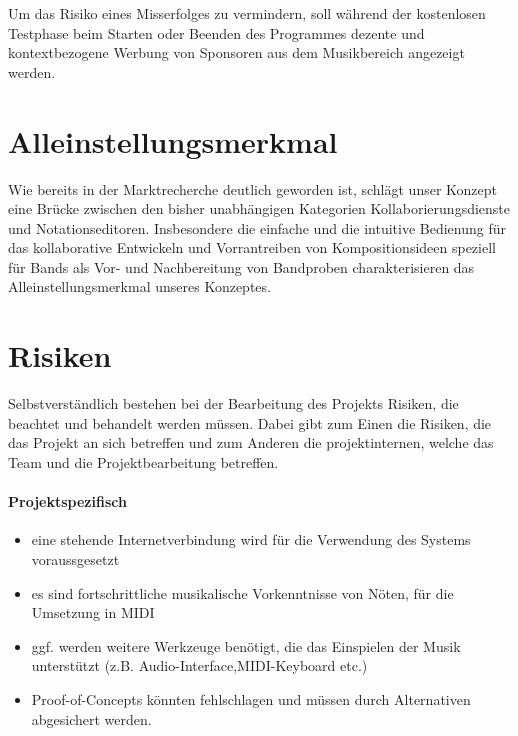 \documentclass[12pt]{scrartcl}
\begin{document}
Um das Risiko eines Misserfolges zu vermindern, soll während der kostenlosen Testphase beim Starten oder Beenden des Programmes dezente und kontextbezogene Werbung von Sponsoren aus dem Musikbereich angezeigt werden.



\section{Alleinstellungsmerkmal}

Wie bereits in der Marktrecherche deutlich geworden ist, schlägt unser Konzept eine Brücke zwischen den bisher unabhängigen Kategorien Kollaborierungsdienste und Notationseditoren. Insbesondere die einfache und die intuitive Bedienung für das kollaborative Entwickeln und Vorrantreiben von Kompositionsideen speziell für Bands als Vor- und Nachbereitung von Bandproben charakterisieren das Alleinstellungsmerkmal unseres Konzeptes.


\section{Risiken}



Selbstverständlich bestehen bei der Bearbeitung des Projekts Risiken, die beachtet und behandelt werden müssen. Dabei gibt zum Einen die Risiken, die das Projekt an sich betreffen und zum Anderen die projektinternen, welche das Team und die Projektbearbeitung betreffen.

\paragraph{Projektspezifisch}
\begin{itemize}
\item eine stehende Internetverbindung wird für die Verwendung des Systems voraussgesetzt
\item es sind fortschrittliche musikalische Vorkenntnisse von Nöten, für die Umsetzung in MIDI
\item ggf. werden weitere Werkzeuge benötigt, die das Einspielen der Musik unterstützt (z.B. Audio-Interface,MIDI-Keyboard etc.)
\item Proof-of-Concepts könnten fehlschlagen und müssen durch Alternativen abgesichert werden.
\end{itemize}
\end{document}
